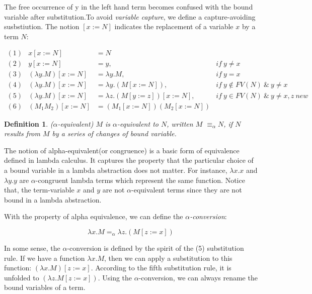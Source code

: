 \documentclass[a4paper,11pt,twoside]{report}
\newtheorem{def1}{\textbf{Definition}}[chapter]
\begin{document}
The free occurrence of y in the left hand term becomes confused with the bound variable after substitution.To avoid \textit{variable capture}, we define a capture-avoiding susbstiution. The notion $[x:=N]$ indicates the replacement of a variable $x$ by a term $N$:

\begin{equation*}
\begin{array}{lrll}
(1)&x[x:=N]&=N & ~\\
(2)&y[x:=N]&=y,& if\ y\neq x\\
(3)&(\lambda y.M)[x:=N]&=\lambda y.M,& if\ y=x\\
(4)&(\lambda y.M)[x:=N]&=\lambda y.(M[x:=N]),& if\ y\notin FV(N)\ \& \ y\neq x\\
(5)&(\lambda y.M)[x:=N]&=\lambda z.(M[y:=z])[x:=N],& if\ y\in FV(N)\ \& \ y\neq x,z\  new\\
(6)&(M_1M_2)[x:=N] &= (M_1[x:=N])(M_2[x:=N])&
\end{array}
\end{equation*}

\begin{def1}\label{def1}
($\alpha$-equivalent) $M$ is $\alpha$-equivalent to $N$, written $M$ $\equiv_\alpha N$, if $N$ results from $M$ by a series of changes of bound variable.
\end{def1}

The notion of alpha-equivalent(or congruence) is a basic form of equivalence defined in lambda calculus. It captures the property that the particular choice of a bound variable in a lambda abstraction does not matter. For instance, $\lambda x.x$ and $\lambda y.y$ are $\alpha$-congruent lambda terms which represent the same function. Notice that, the term-variable $x$ and $y$ are not $\alpha$-equivalent terms since they are not bound in a lambda abstraction.

With the property of alpha equivalence, we can define the \textit{$\alpha$-conversion}:

\begin{equation*}
\lambda x.M =_\alpha \lambda z.(M[z:=x])
\end{equation*}

In some sense, the $\alpha$-conversion is defined by the spirit of the (5) substitution rule. If we have a function $\lambda x.M$, then we can apply a substitution to this function: $(\lambda x.M)[z:=x]$. According to the fifth substitution rule, it is unfolded to $(\lambda z.M[z:=x])$. Using the $\alpha$-conversion, we can always rename the bound variables of a term. 
\end{document}
